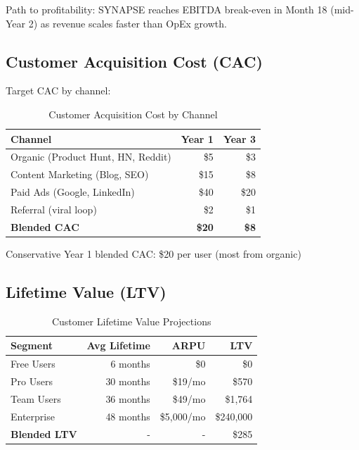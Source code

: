 \documentclass{report}
\begin{document}
Path to profitability: SYNAPSE reaches EBITDA break-even in Month 18 (mid-Year 2) as revenue scales faster than OpEx growth.

\subsection{Customer Acquisition Cost (CAC)}

Target CAC by channel:

\begin{table}[h]
\centering
\begin{tabular}{|l|r|r|}
\toprule
\textbf{Channel} & \textbf{Year 1} & \textbf{Year 3} \\
\midrule
Organic (Product Hunt, HN, Reddit) & \$5 & \$3 \\
Content Marketing (Blog, SEO) & \$15 & \$8 \\
Paid Ads (Google, LinkedIn) & \$40 & \$20 \\
Referral (viral loop) & \$2 & \$1 \\
\midrule
\textbf{Blended CAC} & \textbf{\$20} & \textbf{\$8} \\
\bottomrule
\end{tabular}
\caption{Customer Acquisition Cost by Channel}
\end{table}

Conservative Year 1 blended CAC: \$20 per user (most from organic)

\subsection{Lifetime Value (LTV)}

\begin{table}[h]
\centering
\begin{tabular}{|l|r|r|r|}
\toprule
\textbf{Segment} & \textbf{Avg Lifetime} & \textbf{ARPU} & \textbf{LTV} \\
\midrule
Free Users & 6 months & \$0 & \$0 \\
Pro Users & 30 months & \$19/mo & \$570 \\
Team Users & 36 months & \$49/mo & \$1,764 \\
Enterprise & 48 months & \$5,000/mo & \$240,000 \\
\midrule
\textbf{Blended LTV} & - & - & \$285 \\
\bottomrule
\end{tabular}
\caption{Customer Lifetime Value Projections}
\end{table}
\end{document}
